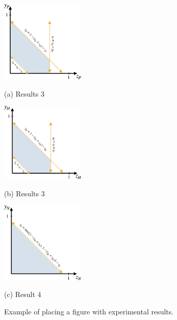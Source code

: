 \documentclass{article}
\begin{document}
	\begin{figure}[h]
	\begin{minipage}[h]{0.30\linewidth}
		\centering
		\centerline{\includegraphics[width=4.0cm]{figs/parent_region.png}}
		\centerline{(a) Results 3}\medskip
	\end{minipage}
					\begin{minipage}[h]{.30\linewidth}
								\centering
								\centerline{\includegraphics[width=4.0cm]{figs/inherited_region.png}}
								\centerline{(b) Results 3}\medskip
							\end{minipage}
					\begin{minipage}[h]{0.30\linewidth}
								\centering
								\centerline{\includegraphics[width=4.0cm]{figs/novel_region.png}}
								\centerline{(c) Result 4}\medskip
							\end{minipage}
	\caption{Example of placing a figure with experimental results.}
	\label{fig:regions}
\end{figure}
\end{document}
